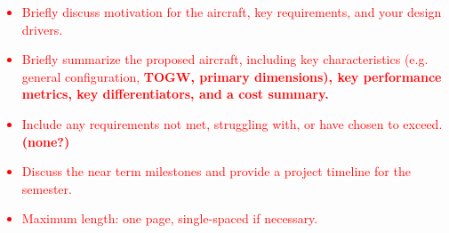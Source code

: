 \textcolor{red}{
\begin{itemize}
    \item Briefly discuss motivation for the aircraft, key requirements, and your design drivers. 
    \item Briefly  summarize the proposed aircraft, including key  characteristics (e.g. general configuration, \textbf{TOGW, primary dimensions), key performance metrics, key differentiators, and a cost summary.}
    \item Include any requirements not met, struggling with, or have chosen to exceed. \textbf{(none?)}
    \item Discuss the near term milestones and provide a project timeline for the semester. 
    \item Maximum length: one page, single-spaced if necessary. 
\end{itemize}}